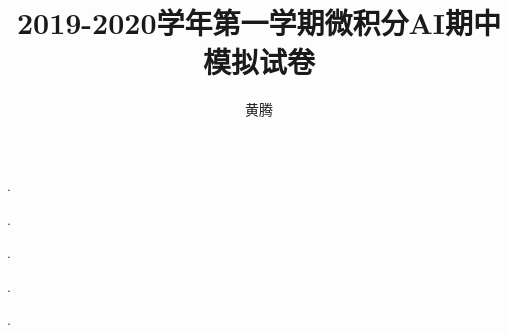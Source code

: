 \documentclass[answer]{USTBExam}
\title{2019-2020学年第一学期微积分AI期中模拟试卷}
\author{黄腾}
\begin{document}
\makehead


\begin{problem}
  
  \pickout{}
  \options{}
    {}
    {}
    {}
\end{problem}

\begin{problem}
  
  \pickout{}
  \options{}
    {}
    {}
    {}
\end{problem}

\begin{problem}
  
  \pickout{}
  \options{}
    {}
    {}
    {}
\end{problem}

\begin{problem}
  
  \pickout{}
  \options{}
    {}
    {}
    {}
\end{problem}

\begin{problem}
  
  \pickout{}
  \options{}
    {}
    {}
    {}
\end{problem}

\begin{problem}
  
  \pickout{}
  \options{}
    {}
    {}
    {}
\end{problem}


\begin{problem}
  
  \fillin{}.
\end{problem}

\begin{problem}
  
  \fillin{}.
\end{problem}

\begin{problem}
  
  \fillin{}.
\end{problem}

\begin{problem}

  \fillin{}.
\end{problem}

\begin{problem}
  
  \fillin{}.
\end{problem}
\end{document}
